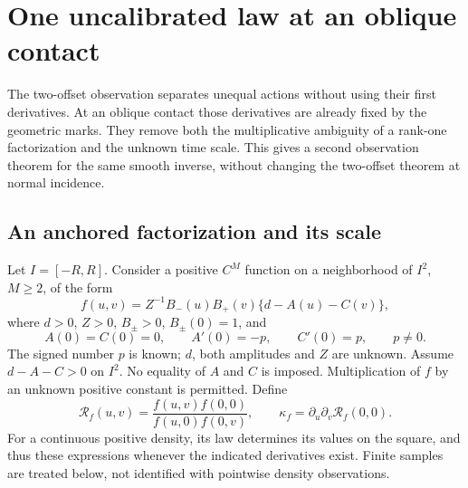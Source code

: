 \section{One uncalibrated law at an oblique contact}
\label{sec:v72-one-law}

The two-offset observation separates unequal actions without using their
first derivatives.  At an oblique contact those derivatives are already
fixed by the geometric marks.  They remove both the multiplicative
ambiguity of a rank-one factorization and the unknown time scale.  This
gives a second observation theorem for the same smooth inverse, without
changing the two-offset theorem at normal incidence.

\subsection{An anchored factorization and its scale}

Let $I=[-R,R]$.  Consider a positive $C^M$ function on a neighborhood of
$I^2$, $M\ge2$, of the form
\begin{equation}\label{eq:v72-model}
 f(u,v)=Z^{-1}B_-(u)B_+(v)\{d-A(u)-C(v)\},
\end{equation}
where $d>0$, $Z>0$, $B_\pm>0$, $B_\pm(0)=1$, and
\begin{equation}\label{eq:v72-slopes}
 A(0)=C(0)=0,\qquad A'(0)=-p,\qquad C'(0)=p,\qquad p\ne0.
\end{equation}
The signed number $p$ is known; $d$, both amplitudes and $Z$ are unknown.
Assume $d-A-C>0$ on $I^2$.  No equality of $A$ and $C$ is imposed.
Multiplication of $f$ by an unknown positive constant is permitted.
Define
\begin{equation}\label{eq:v72-cross-ratio}
 \mathcal R_f(u,v)=\frac{f(u,v)f(0,0)}{f(u,0)f(0,v)},\qquad
 \kappa_f=\partial_u\partial_v\mathcal R_f(0,0).
\end{equation}
For a continuous positive density, its law determines its values on the
square, and thus these expressions whenever the indicated derivatives
exist.  Finite samples are treated below, not identified with pointwise
density observations.

